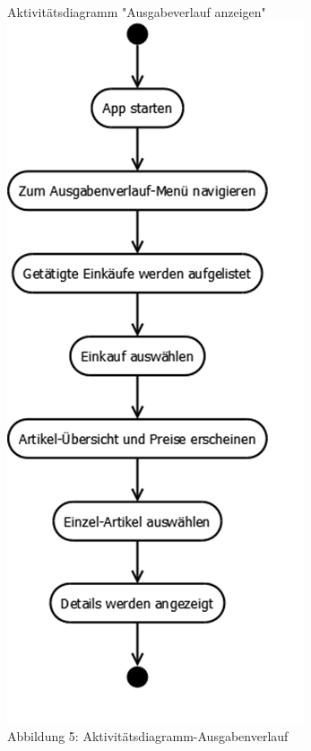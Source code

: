 \documentclass[12pt,a4paper]{article}
\begin{document}
\\
\linebreak
Aktivitätsdiagramm "Ausgabeverlauf anzeigen"
\\
\includegraphics[scale=0.6, origin=l]{Aktivitaets-Diagramm-Ausgabenverlauf.png}
\\
\footnotesize Abbildung 5: Aktivitätsdiagramm-Ausgabenverlauf
\normalsize
\\
\linebreak
\end{document}
